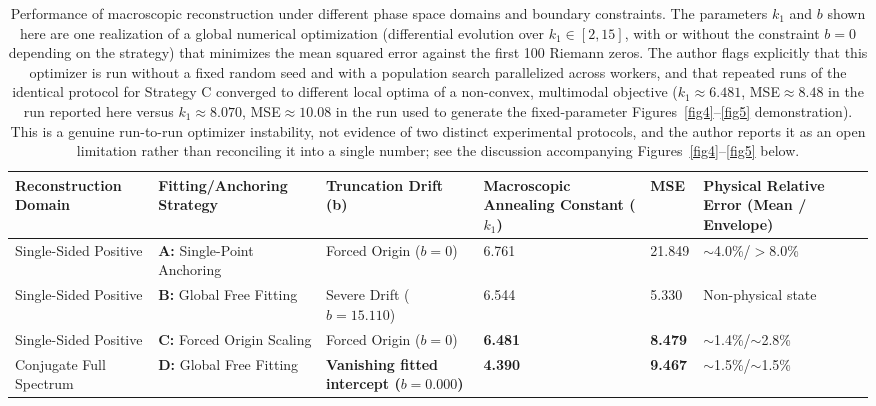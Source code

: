 \documentclass[mca,article,submit,oneauthor,pdftex]{Definitions/mdpi}
\begin{document}
\begin{table}[H]
\caption{Performance of macroscopic reconstruction under different phase space domains and boundary constraints. The parameters $k_1$ and $b$ shown here are one realization of a global numerical optimization (differential evolution over $k_1 \in [2,15]$, with or without the constraint $b=0$ depending on the strategy) that minimizes the mean squared error against the first 100 Riemann zeros. The author flags explicitly that this optimizer is run without a fixed random seed and with a population search parallelized across workers, and that repeated runs of the identical protocol for Strategy C converged to different local optima of a non-convex, multimodal objective ($k_1\approx6.481$, MSE$\approx8.48$ in the run reported here versus $k_1\approx8.070$, MSE$\approx10.08$ in the run used to generate the fixed-parameter Figures~\ref{fig4}--\ref{fig5} demonstration). This is a genuine run-to-run optimizer instability, not evidence of two distinct experimental protocols, and the author reports it as an open limitation rather than reconciling it into a single number; see the discussion accompanying Figures~\ref{fig4}--\ref{fig5} below.}\label{tab1}
\small
\begin{tabularx}{\textwidth}{Y{0.15}Y{0.22}Y{0.19}Y{0.13}Y{0.11}Y{0.20}}
\toprule
\footnotesize\textbf{Recon\-struction Domain} & \footnotesize\textbf{Fitting/An\-choring Strategy} & \footnotesize\textbf{Truncation Drift (b)} & \footnotesize\textbf{Macro\-scopic Annealing Constant ($k_1$)} & \footnotesize\textbf{MSE} & \footnotesize\textbf{Physical Relative Error (Mean / Envelope)} \\
\midrule
Single-Sided Positive & \textbf{A:} Single-Point Anchoring & Forced Origin ($b=0$) & 6.761 & 21.849 & $\sim$4.0\%/$>$8.0\% \\
Single-Sided Positive & \textbf{B:} Global Free Fitting & Severe Drift ($b=15.110$) & 6.544 & 5.330 & Non-physical state \\
Single-Sided Positive & \textbf{C:} Forced Origin Scaling & Forced Origin ($b=0$) & \textbf{6.481} & \textbf{8.479} & $\sim$1.4\%/$\sim$2.8\% \\
Conjugate Full Spectrum & \textbf{D:} Global Free Fitting & \textbf{Vanishing fitted intercept ($b=0.000$)} & \textbf{4.390} & \textbf{9.467} & $\sim$1.5\%/$\sim$1.5\% \\
\bottomrule
\end{tabularx}
\end{table}
\end{document}
